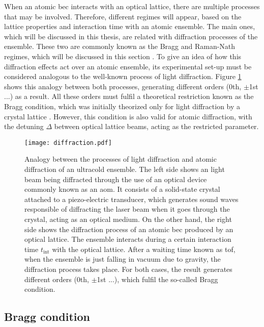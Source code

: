 When an atomic \ac{bec} interacts with an optical lattice, there are multiple processes that may be involved. Therefore, different regimes will appear, based on the lattice properties and interaction time with an atomic ensemble. The main ones, which will be discussed in this thesis, are related with diffraction processes of the ensemble. These two are commonly known as the Bragg and Raman-Nath regimes, which will be discussed in this section \cite{Mueller2008,Ovchinnikov1999}. To give an idea of how this diffraction effects act over an atomic ensemble, its experimental set-up must be considered analogous to the well-known process of light diffraction. Figure \ref{fig:diffraction} shows this analogy between both processes, generating different orders (0th, $\pm$1st ...) as a result. All these orders must fulfil a theoretical restriction known as the Bragg condition, which was initially theorized only for light diffraction by a crystal lattice \cite{Bragg1913}. However, this condition is also valid for atomic diffraction, with the detuning $\Delta$ between optical lattice beams, acting as the restricted parameter.


\begin{figure}[!htbp]\centering
	\texttt{[image: diffraction.pdf]}
	\caption[Analogy between the processes of light diffraction and atomic diffraction of an ultracold ensemble]{Analogy between the processes of light diffraction and atomic diffraction of an ultracold ensemble. The left side shows an light beam being diffracted through the use of an optical device commonly known as an \Acf{aom}. It consists of a solid-state crystal attached to a piezo-electric transducer, which generates sound waves responsible of diffracting the laser beam when it goes through the crystal, acting as an optical medium. On the other hand, the right side shows the diffraction process of an atomic \ac{bec} produced by an optical lattice. The ensemble interacts during a certain interaction time $t_{\text{int}}$ with the optical lattice. After a waiting time known as \Acf{tof}, when the ensemble is just falling in vacuum due to gravity, the diffraction process takes place. For both cases, the result generates different orders (0th, $\pm$1st ...), which fulfil the so-called Bragg condition.}\label{fig:diffraction}
\end{figure}


\subsection{Bragg condition}\label{subsec:Bragg_condition}

